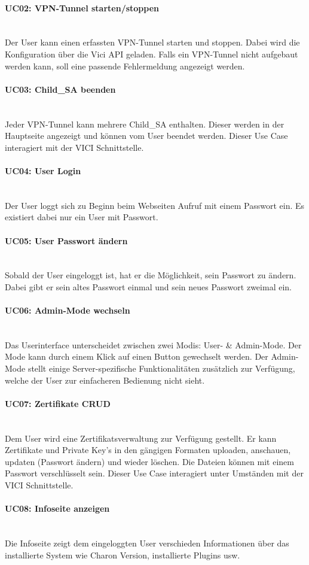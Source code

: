 \paragraph{UC02: VPN-Tunnel starten/stoppen}\mbox{} \\
Der User kann einen erfassten VPN-Tunnel starten und stoppen. Dabei wird die Konfiguration über die Vici API geladen. Falls ein VPN-Tunnel nicht aufgebaut werden kann, soll eine passende Fehlermeldung angezeigt werden. 

\paragraph{UC03: Child\_SA beenden}\mbox{} \\
Jeder VPN-Tunnel kann mehrere Child\_SA enthalten. Dieser werden in der Hauptseite angezeigt und können vom User beendet werden. Dieser Use Case interagiert mit der VICI Schnittstelle.

\paragraph{UC04: User Login}\mbox{} \\
Der User loggt sich zu Beginn beim Webseiten Aufruf mit einem Passwort ein. Es existiert dabei nur ein User mit Passwort.

\paragraph{UC05: User Passwort ändern}\mbox{} \\
Sobald der User eingeloggt ist, hat er die Möglichkeit, sein Passwort zu ändern. Dabei gibt er sein altes Passwort einmal und sein neues Passwort zweimal ein.

\paragraph{UC06: Admin-Mode wechseln}\mbox{} \\
Das Userinterface unterscheidet zwischen zwei Modis: User- \& Admin-Mode. Der Mode kann durch einem Klick auf einen Button gewechselt werden. Der Admin-Mode stellt einige Server-spezifische Funktionalitäten zusätzlich zur Verfügung, welche der User zur einfacheren Bedienung nicht sieht.

\paragraph{UC07: Zertifikate CRUD}\mbox{} \\
Dem User wird eine Zertifikatsverwaltung zur Verfügung gestellt. Er kann Zertifikate und Private Key's in den gängigen Formaten uploaden, anschauen, updaten (Passwort ändern) und wieder löschen. Die Dateien können mit einem Passwort verschlüsselt sein. Dieser Use Case interagiert unter Umständen mit der VICI Schnittstelle.

\paragraph{UC08: Infoseite anzeigen}\mbox{} \\
Die Infoseite zeigt dem eingeloggten User verschieden Informationen über das installierte System wie Charon Version, installierte Plugins usw.

\newpage




